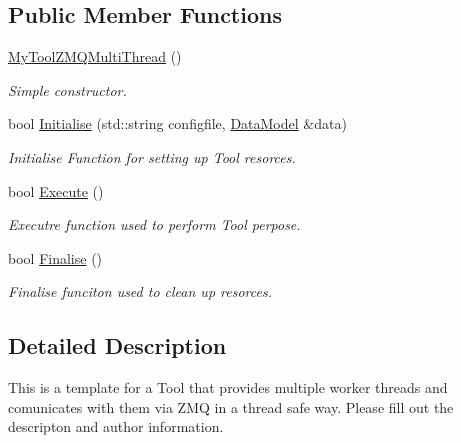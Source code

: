 \subsection*{Public Member Functions}
\begin{DoxyCompactItemize}
\item 
\hypertarget{classMyToolZMQMultiThread_a4036001006932887c7ed36eda1d1af50}{\hyperlink{classMyToolZMQMultiThread_a4036001006932887c7ed36eda1d1af50}{My\-Tool\-Z\-M\-Q\-Multi\-Thread} ()}\label{classMyToolZMQMultiThread_a4036001006932887c7ed36eda1d1af50}

\begin{DoxyCompactList}\small\item\em Simple constructor. \end{DoxyCompactList}\item 
bool \hyperlink{classMyToolZMQMultiThread_a99c3814d25f3868c5287f314bb63281d}{Initialise} (std\-::string configfile, \hyperlink{classDataModel}{Data\-Model} \&data)
\begin{DoxyCompactList}\small\item\em Initialise Function for setting up Tool resorces. \end{DoxyCompactList}\item 
\hypertarget{classMyToolZMQMultiThread_a15dea77298aa4c4b0e8a5cbbd244df28}{bool \hyperlink{classMyToolZMQMultiThread_a15dea77298aa4c4b0e8a5cbbd244df28}{Execute} ()}\label{classMyToolZMQMultiThread_a15dea77298aa4c4b0e8a5cbbd244df28}

\begin{DoxyCompactList}\small\item\em Executre function used to perform Tool perpose. \end{DoxyCompactList}\item 
\hypertarget{classMyToolZMQMultiThread_a4a7d1462aa1f6ea790be76161267547d}{bool \hyperlink{classMyToolZMQMultiThread_a4a7d1462aa1f6ea790be76161267547d}{Finalise} ()}\label{classMyToolZMQMultiThread_a4a7d1462aa1f6ea790be76161267547d}

\begin{DoxyCompactList}\small\item\em Finalise funciton used to clean up resorces. \end{DoxyCompactList}\end{DoxyCompactItemize}


\subsection{Detailed Description}
This is a template for a Tool that provides multiple worker threads and comunicates with them via Z\-M\-Q in a thread safe way. Please fill out the descripton and author information.

